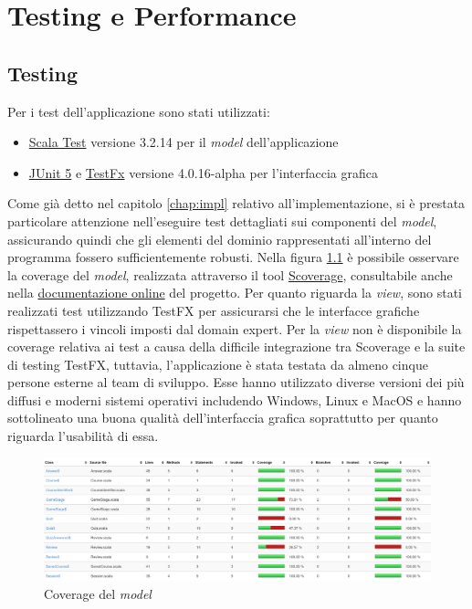 \chapter{Testing e Performance}
\section{Testing}
    Per i test dell'applicazione sono stati utilizzati:
    \begin{itemize}
        \item \href{https://www.scalatest.org/}{Scala Test} versione 3.2.14 per il \textit{model} dell'applicazione
        \item \href{https://junit.org/junit5/}{JUnit 5} e \href{https://github.com/TestFX/TestFX}{TestFx} versione 4.0.16-alpha per l'interfaccia grafica
    \end{itemize}
    
    Come già detto nel capitolo \ref{chap:impl} relativo all'implementazione, si è prestata particolare attenzione nell'eseguire test dettagliati sui componenti del \textit{model}, assicurando quindi che gli elementi del dominio rappresentati all'interno del programma fossero sufficientemente robusti.
    Nella figura \ref{fig:coverage} è possibile osservare la coverage del \textit{model}, realizzata attraverso il tool \href{https://github.com/scoverage/sbt-scoverage}{Scoverage}, consultabile anche nella \href{https://isiquiz.github.io/PPS-22-isiquiz/coverage/}{documentazione online} del progetto.
    Per quanto riguarda la \textit{view}, sono stati realizzati test utilizzando TestFX per assicurarsi che le interfacce grafiche rispettassero i vincoli imposti dal domain expert.
    Per la \textit{view} non è disponibile la coverage relativa ai test a causa della difficile integrazione tra Scoverage e la suite di testing TestFX, tuttavia, l'applicazione è stata testata da almeno cinque persone esterne al team di sviluppo. Esse hanno utilizzato diverse versioni dei più diffusi e moderni sistemi operativi includendo Windows, Linux e MacOS e hanno sottolineato una buona qualità dell'interfaccia grafica soprattutto per quanto riguarda l'usabilità di essa.
    \begin{figure}[H]
        \centering
        \includegraphics[width=\textwidth]{Images/coverage.png}
        \caption{Coverage del \textit{model}}
        \label{fig:coverage}
    \end{figure}

